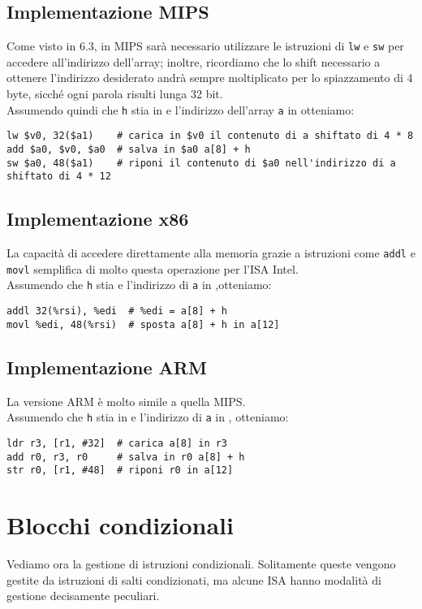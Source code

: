 \documentclass[class=book, crop=false, oneside]{standalone}
\begin{document}
\subsection*{Implementazione MIPS}
Come visto in 6.3, in MIPS sarà necessario utilizzare le istruzioni di \texttt{lw} e \texttt{sw} per accedere all'indirizzo dell'array; inoltre, ricordiamo che  lo shift necessario a ottenere l'indirizzo desiderato andrà sempre moltiplicato per lo spiazzamento di 4 byte, sicché ogni parola risulti lunga 32 bit.\\
Assumendo quindi che \texttt{h} stia in  e l'indirizzo dell'array \texttt{a} in  otteniamo:
\begin{verbatim}
lw $v0, 32($a1)    # carica in $v0 il contenuto di a shiftato di 4 * 8
add $a0, $v0, $a0  # salva in $a0 a[8] + h
sw $a0, 48($a1)    # riponi il contenuto di $a0 nell'indirizzo di a shiftato di 4 * 12
\end{verbatim}

\subsection*{Implementazione x86}
La capacità di accedere direttamente alla memoria grazie a istruzioni come \texttt{addl} e \texttt{movl} semplifica di molto questa operazione per l'ISA Intel.\\
Assumendo che  \texttt{h} stia  e l'indirizzo di \texttt{a} in ,otteniamo:
\begin{verbatim}
addl 32(%rsi), %edi  # %edi = a[8] + h
movl %edi, 48(%rsi)  # sposta a[8] + h in a[12]
\end{verbatim}

\subsection*{Implementazione ARM}
La versione ARM è molto simile a quella MIPS.\\
Assumendo che \texttt{h} stia in  e l'indirizzo di \texttt{a} in , otteniamo:
\begin{verbatim}
ldr r3, [r1, #32]  # carica a[8] in r3
add r0, r3, r0     # salva in r0 a[8] + h
str r0, [r1, #48]  # riponi r0 in a[12]
\end{verbatim}


\section{Blocchi condizionali}
Vediamo ora la gestione di istruzioni condizionali. Solitamente queste vengono gestite da istruzioni di salti condizionati, ma alcune ISA hanno modalità di gestione decisamente peculiari.
\end{document}
